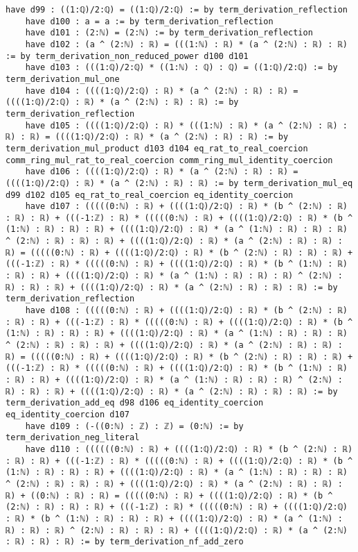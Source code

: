 \documentclass{article}
\begin{document}
\begin{tcolorbox}[colback=white!10, width=\linewidth]
\begin{lstlisting}[language=Lean4]
    have d99 : ((1:ℚ)/2:ℚ) = ((1:ℚ)/2:ℚ) := by term_derivation_reflection
    have d100 : a = a := by term_derivation_reflection
    have d101 : (2:ℕ) = (2:ℕ) := by term_derivation_reflection
    have d102 : (a ^ (2:ℕ) : ℝ) = (((1:ℕ) : ℝ) * (a ^ (2:ℕ) : ℝ) : ℝ) := by term_derivation_non_reduced_power d100 d101
    have d103 : (((1:ℚ)/2:ℚ) * ((1:ℕ) : ℚ) : ℚ) = ((1:ℚ)/2:ℚ) := by term_derivation_mul_one
    have d104 : ((((1:ℚ)/2:ℚ) : ℝ) * (a ^ (2:ℕ) : ℝ) : ℝ) = ((((1:ℚ)/2:ℚ) : ℝ) * (a ^ (2:ℕ) : ℝ) : ℝ) := by term_derivation_reflection
    have d105 : ((((1:ℚ)/2:ℚ) : ℝ) * (((1:ℕ) : ℝ) * (a ^ (2:ℕ) : ℝ) : ℝ) : ℝ) = ((((1:ℚ)/2:ℚ) : ℝ) * (a ^ (2:ℕ) : ℝ) : ℝ) := by term_derivation_mul_product d103 d104 eq_rat_to_real_coercion comm_ring_mul_rat_to_real_coercion comm_ring_mul_identity_coercion
    have d106 : ((((1:ℚ)/2:ℚ) : ℝ) * (a ^ (2:ℕ) : ℝ) : ℝ) = ((((1:ℚ)/2:ℚ) : ℝ) * (a ^ (2:ℕ) : ℝ) : ℝ) := by term_derivation_mul_eq d99 d102 d105 eq_rat_to_real_coercion eq_identity_coercion
    have d107 : (((((0:ℕ) : ℝ) + ((((1:ℚ)/2:ℚ) : ℝ) * (b ^ (2:ℕ) : ℝ) : ℝ) : ℝ) + (((-1:ℤ) : ℝ) * (((((0:ℕ) : ℝ) + ((((1:ℚ)/2:ℚ) : ℝ) * (b ^ (1:ℕ) : ℝ) : ℝ) : ℝ) + ((((1:ℚ)/2:ℚ) : ℝ) * (a ^ (1:ℕ) : ℝ) : ℝ) : ℝ) ^ (2:ℕ) : ℝ) : ℝ) : ℝ) + ((((1:ℚ)/2:ℚ) : ℝ) * (a ^ (2:ℕ) : ℝ) : ℝ) : ℝ) = (((((0:ℕ) : ℝ) + ((((1:ℚ)/2:ℚ) : ℝ) * (b ^ (2:ℕ) : ℝ) : ℝ) : ℝ) + (((-1:ℤ) : ℝ) * (((((0:ℕ) : ℝ) + ((((1:ℚ)/2:ℚ) : ℝ) * (b ^ (1:ℕ) : ℝ) : ℝ) : ℝ) + ((((1:ℚ)/2:ℚ) : ℝ) * (a ^ (1:ℕ) : ℝ) : ℝ) : ℝ) ^ (2:ℕ) : ℝ) : ℝ) : ℝ) + ((((1:ℚ)/2:ℚ) : ℝ) * (a ^ (2:ℕ) : ℝ) : ℝ) : ℝ) := by term_derivation_reflection
    have d108 : (((((0:ℕ) : ℝ) + ((((1:ℚ)/2:ℚ) : ℝ) * (b ^ (2:ℕ) : ℝ) : ℝ) : ℝ) + (((-1:ℤ) : ℝ) * (((((0:ℕ) : ℝ) + ((((1:ℚ)/2:ℚ) : ℝ) * (b ^ (1:ℕ) : ℝ) : ℝ) : ℝ) + ((((1:ℚ)/2:ℚ) : ℝ) * (a ^ (1:ℕ) : ℝ) : ℝ) : ℝ) ^ (2:ℕ) : ℝ) : ℝ) : ℝ) + ((((1:ℚ)/2:ℚ) : ℝ) * (a ^ (2:ℕ) : ℝ) : ℝ) : ℝ) = (((((0:ℕ) : ℝ) + ((((1:ℚ)/2:ℚ) : ℝ) * (b ^ (2:ℕ) : ℝ) : ℝ) : ℝ) + (((-1:ℤ) : ℝ) * (((((0:ℕ) : ℝ) + ((((1:ℚ)/2:ℚ) : ℝ) * (b ^ (1:ℕ) : ℝ) : ℝ) : ℝ) + ((((1:ℚ)/2:ℚ) : ℝ) * (a ^ (1:ℕ) : ℝ) : ℝ) : ℝ) ^ (2:ℕ) : ℝ) : ℝ) : ℝ) + ((((1:ℚ)/2:ℚ) : ℝ) * (a ^ (2:ℕ) : ℝ) : ℝ) : ℝ) := by term_derivation_add_eq d98 d106 eq_identity_coercion eq_identity_coercion d107
    have d109 : (-((0:ℕ) : ℤ) : ℤ) = (0:ℕ) := by term_derivation_neg_literal
    have d110 : ((((((0:ℕ) : ℝ) + ((((1:ℚ)/2:ℚ) : ℝ) * (b ^ (2:ℕ) : ℝ) : ℝ) : ℝ) + (((-1:ℤ) : ℝ) * (((((0:ℕ) : ℝ) + ((((1:ℚ)/2:ℚ) : ℝ) * (b ^ (1:ℕ) : ℝ) : ℝ) : ℝ) + ((((1:ℚ)/2:ℚ) : ℝ) * (a ^ (1:ℕ) : ℝ) : ℝ) : ℝ) ^ (2:ℕ) : ℝ) : ℝ) : ℝ) + ((((1:ℚ)/2:ℚ) : ℝ) * (a ^ (2:ℕ) : ℝ) : ℝ) : ℝ) + ((0:ℕ) : ℝ) : ℝ) = (((((0:ℕ) : ℝ) + ((((1:ℚ)/2:ℚ) : ℝ) * (b ^ (2:ℕ) : ℝ) : ℝ) : ℝ) + (((-1:ℤ) : ℝ) * (((((0:ℕ) : ℝ) + ((((1:ℚ)/2:ℚ) : ℝ) * (b ^ (1:ℕ) : ℝ) : ℝ) : ℝ) + ((((1:ℚ)/2:ℚ) : ℝ) * (a ^ (1:ℕ) : ℝ) : ℝ) : ℝ) ^ (2:ℕ) : ℝ) : ℝ) : ℝ) + ((((1:ℚ)/2:ℚ) : ℝ) * (a ^ (2:ℕ) : ℝ) : ℝ) : ℝ) := by term_derivation_nf_add_zero

\end{lstlisting}
\end{tcolorbox}
\end{document}
